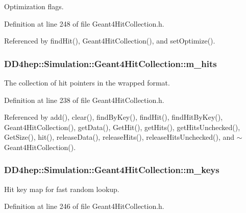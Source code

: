 Optimization flags. 

Definition at line 248 of file Geant4HitCollection.h.

Referenced by findHit(), Geant4HitCollection(), and setOptimize().\hypertarget{class_d_d4hep_1_1_simulation_1_1_geant4_hit_collection_a8a2e237f209928a1598ccf0b72cd3d44}{
\subsubsection[{m\_\-hits}]{ {\bf DD4hep::Simulation::Geant4HitCollection::m\_\-hits}}}
\label{class_d_d4hep_1_1_simulation_1_1_geant4_hit_collection_a8a2e237f209928a1598ccf0b72cd3d44}


The collection of hit pointers in the wrapped format. 

Definition at line 238 of file Geant4HitCollection.h.

Referenced by add(), clear(), findByKey(), findHit(), findHitByKey(), Geant4HitCollection(), getData(), GetHit(), getHits(), getHitsUnchecked(), GetSize(), hit(), releaseData(), releaseHits(), releaseHitsUnchecked(), and $\sim$Geant4HitCollection().\hypertarget{class_d_d4hep_1_1_simulation_1_1_geant4_hit_collection_a3d45d2544cef7139ad425c2abc66c45a}{
\subsubsection[{m\_\-keys}]{ {\bf DD4hep::Simulation::Geant4HitCollection::m\_\-keys}}}
\label{class_d_d4hep_1_1_simulation_1_1_geant4_hit_collection_a3d45d2544cef7139ad425c2abc66c45a}


Hit key map for fast random lookup. 

Definition at line 246 of file Geant4HitCollection.h.


